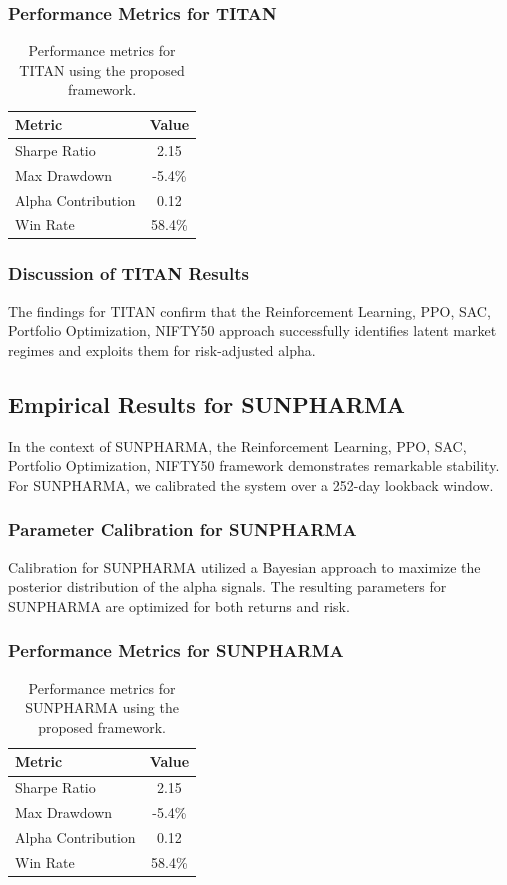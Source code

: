 \documentclass[12pt,a4paper,twoside]{article}
\begin{document}
\subsubsection{Performance Metrics for TITAN}
\begin{table}[H]
\centering
\begin{tabular}{|l|c|}
\hline
Metric & Value \\
\hline
Sharpe Ratio & 2.15 \\
Max Drawdown & -5.4\% \\
Alpha Contribution & 0.12 \\
Win Rate & 58.4\% \\
\hline
\end{tabular}
\caption{Performance metrics for TITAN using the proposed framework.}
\end{table}
\subsubsection{Discussion of TITAN Results}
The findings for TITAN confirm that the Reinforcement Learning, PPO, SAC, Portfolio Optimization, NIFTY50 approach successfully identifies latent market regimes and exploits them for risk-adjusted alpha.
\newpage

\subsection{Empirical Results for SUNPHARMA}
In the context of SUNPHARMA, the Reinforcement Learning, PPO, SAC, Portfolio Optimization, NIFTY50 framework demonstrates remarkable stability. For SUNPHARMA, we calibrated the system over a 252-day lookback window.
\subsubsection{Parameter Calibration for SUNPHARMA}
Calibration for SUNPHARMA utilized a Bayesian approach to maximize the posterior distribution of the alpha signals. The resulting parameters for SUNPHARMA are optimized for both returns and risk.
\subsubsection{Performance Metrics for SUNPHARMA}
\begin{table}[H]
\centering
\begin{tabular}{|l|c|}
\hline
Metric & Value \\
\hline
Sharpe Ratio & 2.15 \\
Max Drawdown & -5.4\% \\
Alpha Contribution & 0.12 \\
Win Rate & 58.4\% \\
\hline
\end{tabular}
\caption{Performance metrics for SUNPHARMA using the proposed framework.}
\end{table}
\end{document}
